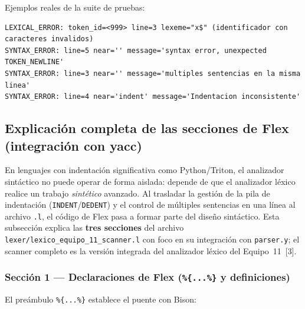 Ejemplos reales de la suite de pruebas:
\begin{verbatim}
LEXICAL_ERROR: token_id=<999> line=3 lexeme="x$" (identificador con caracteres invalidos)
SYNTAX_ERROR: line=5 near='' message='syntax error, unexpected TOKEN_NEWLINE'
SYNTAX_ERROR: line=3 near='' message='multiples sentencias en la misma linea'
SYNTAX_ERROR: line=4 near='indent' message='Indentacion inconsistente'
\end{verbatim}

\subsection{Explicación completa de las secciones de Flex (integración con yacc)}
\label{sec:flex_integracion}

En lenguajes con indentación significativa como Python/Triton, el analizador
sintáctico no puede operar de forma aislada: depende de que el analizador
léxico realice un trabajo \emph{sintético} avanzado. Al trasladar la gestión
de la pila de indentación (\texttt{INDENT}/\texttt{DEDENT}) y el control de
múltiples sentencias en una línea al archivo \texttt{.l}, el código de Flex
pasa a formar parte del diseño sintáctico. Esta subsección explica las
\textbf{tres secciones} del archivo
\texttt{lexer/lexico\_equipo\_11\_scanner.l} con foco en su integración con
\texttt{parser.y}; el scanner completo es la versión integrada del analizador
léxico del Equipo~11~[3].

\subsubsection{Sección 1 --- Declaraciones de Flex (\texttt{\%\{...\%\}} y definiciones)}

El preámbulo \texttt{\%\{...\%\}} establece el puente con Bison:

